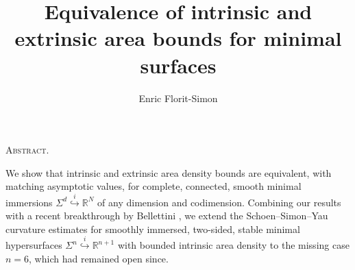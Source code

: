 \documentclass{article}
\newcommand{\R}{\mathbb{R}}
\theoremstyle{definition}
\renewenvironment{abstract}{
  \par\smallskip
  \noindent\textsc{Abstract.}\ %
}{
  \par\medskip
}
\begin{document}
\setlength{\abovedisplayskip}{6pt}          %
\setlength{\belowdisplayskip}{6pt}          %
\setlength{\abovedisplayshortskip}{6pt}     %
\setlength{\belowdisplayshortskip}{6pt}     %

\setlength{\parskip}{0pt plus 1pt}
\setlength{\parindent}{15pt}
\setlength{\abovedisplayskip}{5pt plus 1pt minus 2pt}
\setlength{\belowdisplayskip}{5pt plus 1pt minus 2pt}




\title{\huge 
Equivalence of intrinsic and extrinsic area bounds for minimal surfaces}


\author{Enric Florit-Simon}
\date{}


\begingroup
\renewcommand\thefootnote{}
\endgroup


\maketitle



\begin{abstract}
We show that intrinsic and extrinsic area density bounds are equivalent, with matching asymptotic values, for complete, connected, smooth minimal immersions $\Sigma^d\overset{i}{\hookrightarrow}\R^N$ of any dimension and codimension. Combining our results with a recent breakthrough by Bellettini \cite{Bel25}, we extend the Schoen--Simon--Yau curvature estimates \cite{SSY75} for smoothly immersed, two-sided, stable minimal hypersurfaces $\Sigma^n\overset{i}{\hookrightarrow}\R^{n+1}$ with bounded intrinsic area density to the missing case $n=6$, which had remained open since.
\end{abstract}
\end{document}
